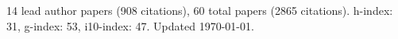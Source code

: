 14 lead author papers (908 citations),
60 total papers (2865 citations).\newline
h-index: 31, g-index: 53, i10-index: 47. Updated \today.